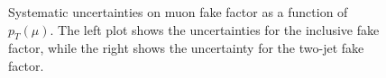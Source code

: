 \begin{figure}
  \centering
  \caption{Systematic uncertainties on muon fake factor as a function of $p_{T}(\mu)$.  The left plot shows the uncertainties for the inclusive fake factor, while the right shows the uncertainty for the two-jet fake factor.}
  \label{fig:MuFake_syst}
\end{figure}


